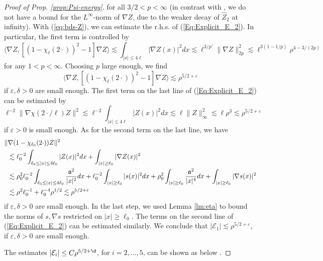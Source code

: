 \documentclass[a4paper,11pt]{article}
\def\cE{\mathcal{E}}
\def\eps{\varepsilon}
\numberwithin{equation}{section}
\begin{document}
\begin{proof}[Proof of Prop. \ref{prop:Psi-energy}]
for all $3/2 < p < \infty$ (in contrast with \cite{BBCOS}, we do not have a bound for the $L^\infty$-norm of $\nabla Z$, due to the weaker decay of $\widehat{Z}_2$ at infinity). With (\ref{eq:bds-Z}), we can estimate the r.h.s. of  (\ref{Eq:Explicit_E_2}). In particular, the first term is controlled by 
\[ \langle \nabla Z , [(1  -  \chi_\ell (2\cdot) )^2 -1 ] \nabla Z \rangle \lesssim \int_{|x| \leq 4\ell} |\nabla Z (x)|^2 dx \lesssim \ell^{3/p'} \| \nabla Z \|_{2p}^2  \lesssim  \ell^{3(1-1/p)} \rho^{4-3/(2p)} \]
for any $1 < p < \infty$. Choosing $p$ large enough, we find 
\[ \langle \nabla Z , [(1  -  \chi_\ell (2\cdot) )^2 -1 ] \nabla Z \rangle \lesssim  \rho^{5/2+\eps} \]
if $\eps,\delta > 0$ are small enough. The first term on the last line of (\ref{Eq:Explicit_E_2}) can be estimated by 
\[ \ell^{-2} \| \nabla \chi (2 \cdot / \ell) Z \|^2 \lesssim \ell^{-2} \int_{|x| \leq 4\ell} |Z (x) |^2 dx \lesssim \ell \| Z \|_\infty^2 \lesssim \ell \rho^3 \lesssim \rho^{5/2+\eps} \]
if $\eps > 0$ is small enough. As for the second term on the last line, we have 
\[ \begin{split} \| &\nabla (1- \chi_{\ell_0} (2 \cdot))Z \|^2 \\ &\lesssim \ell_0^{-2} \int_{\ell_0 \leq |x| \leq 4\ell_0} |Z (x)|^2 dx + \int_{|x| \geq \ell_0} |\nabla Z (x)|^2 \\ &\lesssim \rho_0^2 \ell_0^{-2} \int_{\ell_0 \leq |x| \leq 4\ell_0} \frac{\frak{a}^2}{|x|^2} dx + \ell_0^{-2} \int_{|x| \geq \ell_0} |s(x)|^2 dx + \rho_0^2 \int_{|x| \geq \ell_0} \frac{\frak{a}^2}{|x|^4} dx + \int_{|x| \geq \ell_0} |\nabla s (x)|^2\\ &\lesssim \rho^2 \ell_0^{-1} + \ell_0^{-4} \rho^{1/2} \lesssim \rho^{5/2+\eps} \end{split} \]
if $\eps, \delta > 0$ are small enough. In the last step, we used Lemma \ref{lm:eta} to bound the norms of $s, \nabla s$ restricted on $|x| \geq \ell_0$. The terms on the second line of (\ref{Eq:Explicit_E_2}) can be estimated similarly. We conclude that $|\cE_1| \lesssim \rho^{5/2+\eps}$, if $\eps ,\delta > 0$ are small enough. 

The estimates $|\mathcal{E}_i| \leq C \rho^{5/2+\d}$, for $i=2,\ldots,5$,  can be shown as below \cite[Eq. (3.24)]{BBCOS}. 




\end{proof}
\end{document}
